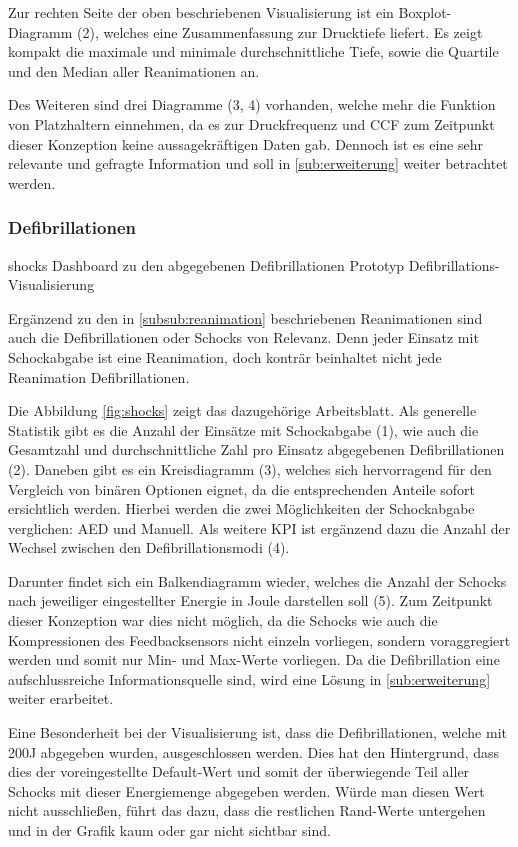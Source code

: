 Zur rechten Seite der oben beschriebenen Visualisierung ist ein Boxplot-Diagramm (2), welches eine Zusammenfassung zur Drucktiefe liefert.
Es zeigt kompakt die maximale und minimale durchschnittliche Tiefe, sowie die Quartile und den Median aller Reanimationen an.

Des Weiteren sind drei Diagramme (3, 4) vorhanden, welche mehr die Funktion von Platzhaltern einnehmen, da es zur Druckfrequenz und \gls{CCF} zum Zeitpunkt dieser Konzeption keine aussagekräftigen Daten gab.
Dennoch ist es eine sehr relevante und gefragte Information und soll in \ref{sub:erweiterung} weiter betrachtet werden.


\subsubsection{Defibrillationen}
\label{subsub:schocks}

\bildbreit
{shocks}
{Dashboard zu den abgegebenen Defibrillationen}
{Prototyp Defibrillations-Visualisierung}

Ergänzend zu den in \ref{subsub:reanimation} beschriebenen Reanimationen sind auch die Defibrillationen oder \glqq Schocks\grqq{} von Relevanz.
Denn jeder Einsatz mit Schockabgabe ist eine Reanimation, doch konträr beinhaltet nicht jede Reanimation Defibrillationen.

Die Abbildung \ref{fig:shocks} zeigt das dazugehörige Arbeitsblatt.
Als generelle Statistik gibt es die Anzahl der Einsätze mit Schockabgabe (1), wie auch die Gesamtzahl  und durchschnittliche Zahl pro Einsatz abgegebenen Defibrillationen (2).
Daneben gibt es ein Kreisdiagramm (3), welches sich hervorragend für den Vergleich von binären Optionen eignet, da die entsprechenden Anteile sofort ersichtlich werden.
Hierbei werden die zwei Möglichkeiten der Schockabgabe verglichen: \gls{AED} und Manuell.
Als weitere \gls{KPI} ist ergänzend dazu die Anzahl der Wechsel zwischen den Defibrillationsmodi (4).

Darunter findet sich ein Balkendiagramm wieder, welches die Anzahl der Schocks nach jeweiliger eingestellter Energie in Joule darstellen soll (5).
Zum Zeitpunkt dieser Konzeption war dies nicht möglich, da die Schocks wie auch die Kompressionen des Feedbacksensors nicht einzeln vorliegen, sondern voraggregiert werden und somit nur Min- und Max-Werte vorliegen.
Da die Defibrillation eine aufschlussreiche Informationsquelle sind, wird eine Lösung in \ref{sub:erweiterung} weiter erarbeitet.

Eine Besonderheit bei der Visualisierung ist, dass die Defibrillationen, welche mit 200J abgegeben wurden, ausgeschlossen werden.
Dies hat den Hintergrund, dass dies der voreingestellte Default-Wert und somit der überwiegende Teil aller Schocks mit dieser Energiemenge abgegeben werden.
Würde man diesen Wert nicht ausschließen, führt das dazu, dass die restlichen \glqq Rand\grqq{}-Werte untergehen und in der Grafik kaum oder gar nicht sichtbar sind.

